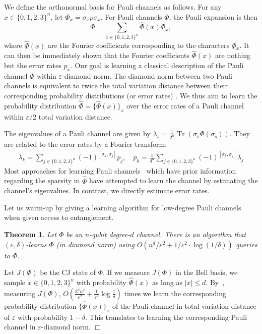 \documentclass[11pt]{article}
\newcommand{\eps}{\varepsilon}
\theoremstyle{plain}
\newtheorem{theorem}{Theorem}
\DeclareMathOperator{\Tr}{Tr}
\theoremstyle{plain}
\theoremstyle{definition}
\theoremstyle{remark}
\renewenvironment{proof}[1][]{
    \begin{trivlist}
    \item[\hspace{\labelsep}{\em\noindent Proof#1:\/}]}
    {{\hfill$\Box$}
    \end{trivlist}
}
\theoremstyle{named}
\begin{document}
We define the orthonormal basis for Pauli channels as follows. For any $x \in \{0,1,2,3\}^n$, let $\Phi_x = \sigma_x \rho \sigma_x$. For Pauli channels $\Phi$, the Pauli expansion is then
\begin{equation}
    \Phi = \sum_{x \in \{0,1,2,3\}^n} \widehat{\Phi}(x) \Phi_x,
\end{equation}
where $\widehat{\Phi}(x)$ are the Fourier coefficients corresponding to the characters $\Phi_x$. It can then be immediately shown that the Fourier coefficients $\widehat{\Phi}(x)$ are nothing but the error rates $p_x$. Our goal is learning a classical description of the Pauli channel $\Phi$ within $\eps$-diamond norm. The diamond norm between two Pauli channels is equivalent to twice the total variation distance between their corresponding probability distributions (or error rates) \cite{magesan2012character}. We thus aim to learn the probability distribution $\widehat{\Phi} = \{ \widehat{\Phi}(x) \}_x$ over the error rates of a Pauli channel within $\eps/2$ total variation distance.

The eigenvalues of a Pauli channel are given by $\lambda_s = \frac{1}{2^n} \Tr(\sigma_s \Phi(\sigma_s))$. They are related to the error rates by a Fourier transform:
\begin{align}
    \lambda_k = \sum_{j \in \{0,1,2,3\}^n} (-1)^{[\sigma_k, \sigma_j]} p_j, \quad
    p_k = \frac{1}{4^n} \sum_{j \in \{0,1,2,3\}^n} (-1)^{[\sigma_k, \sigma_j]} \lambda_j
\end{align}
Most approaches for learning Pauli channels~\cite{flammia2020efficient,harper2021fast} which have prior information regarding the sparsity in $\widehat{\Phi}$ have attempted to learn the channel by estimating the channel's eigenvalues. In contrast, we directly estimate error rates.

Let us warm-up by giving a learning algorithm for low-degree Pauli channels when given access to entanglement.
\begin{theorem}
    Let $\Phi$ be an $n$-qubit degree-$d$ channel. There is an algorithm that $(\varepsilon,
    \delta)$-learns $\Phi$ (in  diamond norm)  using $O\left( n^d/{\varepsilon^2} + 1/\varepsilon^2\cdot \log({1}/{\delta})\right)$ queries to $\Phi$.
\end{theorem}
\begin{proof}
    Let $J(\Phi)$ be the CJ state of $\Phi$. If we measure $J(\Phi)$ in the Bell basis, we sample $x \in \{0,1,2,3\}^n$ with probability $\widehat{\Phi}(x)$ as long as $|x| \leq d$. By~\cite[Theorem 1]{canonne2020short}, measuring $J(\Phi)$, $O\left(\frac{3^d n^d}{\varepsilon^2} + \frac{1}{\varepsilon^2}\log\frac{1}{\delta} \right)$ times we learn the corresponding probability distribution $\{\widehat{\Phi}(x)\}_x$ of the Pauli channel in total variation distance of $\varepsilon$ with probability $1-\delta$. This translates to learning the corresponding Pauli channel in $\varepsilon$-diamond norm.
\end{proof}
\end{document}

